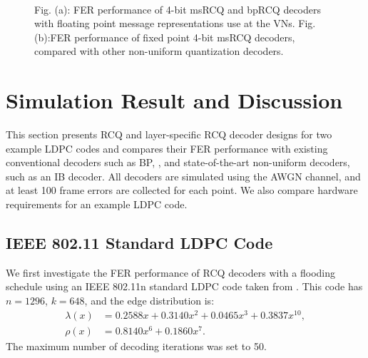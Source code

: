 \documentclass [PhD] {uclathes}
\begin{document}
\begin{figure}[htp] 
    \centering
\\
  \caption{Fig. (a): FER performance of 4-bit msRCQ and bpRCQ decoders with floating point message representations use at the VNs.  Fig. (b):FER performance of fixed point 4-bit msRCQ decoders, compared with other non-uniform quantization decoders. }
\end{figure}

\section{Simulation Result and Discussion}\label{sec: simulation result}
This section presents RCQ and layer-specific RCQ decoder designs for two example LDPC codes and compares their FER performance  with existing conventional decoders such as BP, \minsum, and state-of-the-art non-uniform decoders, such as an IB decoder. All decoders are simulated using the AWGN channel, and at least 100 frame errors are collected for each point.  We also compare hardware requirements for an example LDPC code.
\subsection{IEEE 802.11 Standard LDPC Code}
We first investigate the FER performance of RCQ decoders with a flooding schedule using an IEEE 802.11n standard LDPC code taken from \cite{80211spec}. This code has $n=1296$, $k=648$, and the edge distribution is:
\begin{align}
    \lambda(x) &= 0.2588x+0.3140x^2+0.0465x^3+0.3837x^{10}, \\
    \rho(x) &= 0.8140x^6 +0.1860 x^7.
\end{align}
The maximum number of decoding iterations was set to 50.
\end{document}
